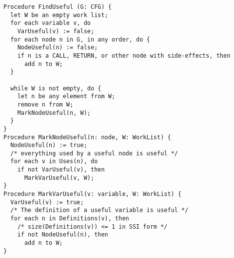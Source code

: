 \begin{verbatim}
Procedure FindUseful (G: CFG) {
  let W be an empty work list;
  for each variable v, do
    VarUseful(v) := false;
  for each node n in G, in any order, do {
    NodeUseful(n) := false;
    if n is a CALL, RETURN, or other node with side-effects, then
      add n to W;
  }

  while W is not empty, do {
    let n be any element from W;
    remove n from W;
    MarkNodeUseful(n, W);
  }
}
Procedure MarkNodeUseful(n: node, W: WorkList) {
  NodeUseful(n) := true;
  /* everything used by a useful node is useful */
  for each v in Uses(n), do
    if not VarUseful(v), then
      MarkVarUseful(v, W);
}
Procedure MarkVarUseful(v: variable, W: WorkList) {
  VarUseful(v) := true;
  /* The definition of a useful variable is useful */
  for each n in Definitions(v), then
    /* size(Definitions(v)) <= 1 in SSI form */
    if not NodeUseful(n), then
      add n to W;
}
\end{verbatim}